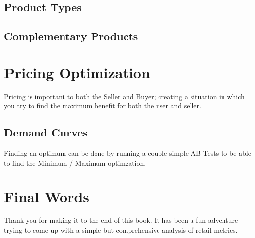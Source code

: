 \documentclass[]{book}
\theoremstyle{definition}
\theoremstyle{definition}
\theoremstyle{definition}
\theoremstyle{remark}
\begin{document}
\hypertarget{product-types}{%
\section{Product Types}\label{product-types}}

\hypertarget{complementary-products}{%
\section{Complementary Products}\label{complementary-products}}

\hypertarget{pricing-optimization}{%
\chapter{Pricing Optimization}\label{pricing-optimization}}

Pricing is important to both the Seller and Buyer; creating a situation
in which you try to find the maximum benefit for both the user and
seller.

\hypertarget{demand-curves}{%
\section{Demand Curves}\label{demand-curves}}

Finding an optimum can be done by running a couple simple AB Tests to be
able to find the Minimum / Maximum optimzation.

\hypertarget{final-words}{%
\chapter{Final Words}\label{final-words}}

Thank you for making it to the end of this book. It has been a fun
adventure trying to come up with a simple but comprehensive analysis of
retail metrics.


\end{document}
